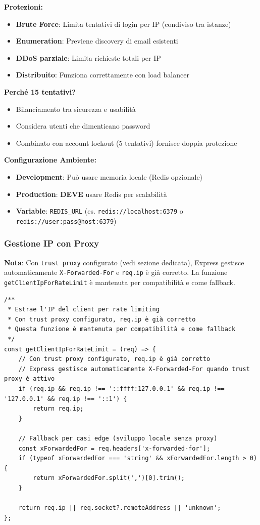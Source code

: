 \documentclass[11pt,a4paper]{article}
\newcommand{\code}[1]{\texttt{#1}}
\newcommand{\important}[1]{\textcolor{red!80!black}{\textbf{#1}}}
\begin{document}
\textbf{Protezioni:}
\begin{itemize}
    \item \textbf{Brute Force}: Limita tentativi di login per IP (condiviso tra istanze)
    \item \textbf{Enumeration}: Previene discovery di email esistenti
    \item \textbf{DDoS parziale}: Limita richieste totali per IP
    \item \textbf{Distribuito}: Funziona correttamente con load balancer
\end{itemize}

\textbf{Perché 15 tentativi?}
\begin{itemize}
    \item Bilanciamento tra sicurezza e usabilità
    \item Considera utenti che dimenticano password
    \item Combinato con account lockout (5 tentativi) fornisce doppia protezione
\end{itemize}

\textbf{Configurazione Ambiente:}
\begin{itemize}
    \item \textbf{Development}: Può usare memoria locale (Redis opzionale)
    \item \textbf{Production}: \important{DEVE} usare Redis per scalabilità
    \item \textbf{Variable}: \code{REDIS_URL} (es. \code{redis://localhost:6379} o \code{redis://user:pass@host:6379})
\end{itemize}

\subsubsection{Gestione IP con Proxy}

\important{Nota}: Con \code{trust proxy} configurato (vedi sezione dedicata), Express gestisce automaticamente \code{X-Forwarded-For} e \code{req.ip} è già corretto. La funzione \code{getClientIpForRateLimit} è mantenuta per compatibilità e come fallback.

\begin{lstlisting}[caption=Estrazione IP Reale con Trust Proxy]
/**
 * Estrae l'IP del client per rate limiting
 * Con trust proxy configurato, req.ip è già corretto
 * Questa funzione è mantenuta per compatibilità e come fallback
 */
const getClientIpForRateLimit = (req) => {
    // Con trust proxy configurato, req.ip è già corretto
    // Express gestisce automaticamente X-Forwarded-For quando trust proxy è attivo
    if (req.ip && req.ip !== '::ffff:127.0.0.1' && req.ip !== '127.0.0.1' && req.ip !== '::1') {
        return req.ip;
    }

    // Fallback per casi edge (sviluppo locale senza proxy)
    const xForwardedFor = req.headers['x-forwarded-for'];
    if (typeof xForwardedFor === 'string' && xForwardedFor.length > 0) {
        return xForwardedFor.split(',')[0].trim();
    }

    return req.ip || req.socket?.remoteAddress || 'unknown';
};
\end{lstlisting}
\end{document}
